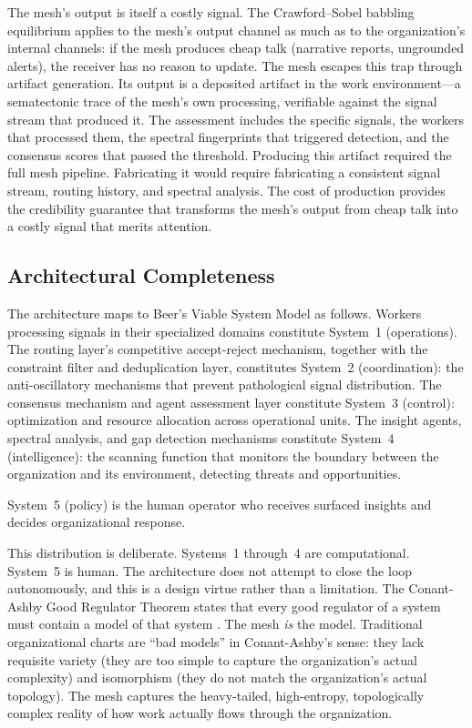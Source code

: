 \documentclass[11pt,a4paper]{article}
\begin{document}
The mesh's output is itself a costly signal. The Crawford--Sobel babbling equilibrium applies to the mesh's output channel as much as to the organization's internal channels: if the mesh produces cheap talk (narrative reports, ungrounded alerts), the receiver has no reason to update. The mesh escapes this trap through artifact generation. Its output is a deposited artifact in the work environment---a sematectonic trace of the mesh's own processing, verifiable against the signal stream that produced it. The assessment includes the specific signals, the workers that processed them, the spectral fingerprints that triggered detection, and the consensus scores that passed the threshold. Producing this artifact required the full mesh pipeline. Fabricating it would require fabricating a consistent signal stream, routing history, and spectral analysis. The cost of production provides the credibility guarantee that transforms the mesh's output from cheap talk into a costly signal that merits attention.


\subsection{Architectural Completeness}
\label{sec:completeness}

The architecture maps to Beer's Viable System Model as follows. Workers processing signals in their specialized domains constitute System~1 (operations). The routing layer's competitive accept-reject mechanism, together with the constraint filter and deduplication layer, constitutes System~2 (coordination): the anti-oscillatory mechanisms that prevent pathological signal distribution. The consensus mechanism and agent assessment layer constitute System~3 (control): optimization and resource allocation across operational units. The insight agents, spectral analysis, and gap detection mechanisms constitute System~4 (intelligence): the scanning function that monitors the boundary between the organization and its environment, detecting threats and opportunities.

System~5 (policy) is the human operator who receives surfaced insights and decides organizational response.

This distribution is deliberate. Systems~1 through~4 are computational. System~5 is human. The architecture does not attempt to close the loop autonomously, and this is a design virtue rather than a limitation. The Conant-Ashby Good Regulator Theorem states that every good regulator of a system must contain a model of that system \citep{conant1970}. The mesh \emph{is} the model. Traditional organizational charts are ``bad models'' in Conant-Ashby's sense: they lack requisite variety (they are too simple to capture the organization's actual complexity) and isomorphism (they do not match the organization's actual topology). The mesh captures the heavy-tailed, high-entropy, topologically complex reality of how work actually flows through the organization.
\end{document}
